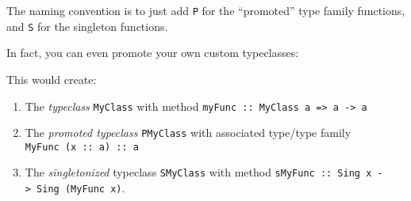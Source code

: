 \documentclass[]{article}
\newenvironment{Shaded}{}{}
\newcommand{\CommentTok}[1]{\textcolor[rgb]{0.38,0.63,0.69}{\textit{#1}}}
\newcommand{\DataTypeTok}[1]{\textcolor[rgb]{0.56,0.13,0.00}{#1}}
\newcommand{\FunctionTok}[1]{\textcolor[rgb]{0.02,0.16,0.49}{#1}}
\newcommand{\KeywordTok}[1]{\textcolor[rgb]{0.00,0.44,0.13}{\textbf{#1}}}
\newcommand{\NormalTok}[1]{#1}
\newcommand{\OtherTok}[1]{\textcolor[rgb]{0.00,0.44,0.13}{#1}}
\begin{document}
\begin{Shaded}
\end{Shaded}

The naming convention is to just add \texttt{P} for the ``promoted'' type family
functions, and \texttt{S} for the singleton functions.

In fact, you can even promote your own custom typeclasses:

\begin{Shaded}
\end{Shaded}

This would create:

\begin{enumerate}
\def\labelenumi{\arabic{enumi}.}
\tightlist
\item
  The \emph{typeclass} \texttt{MyClass} with method
  \texttt{myFunc\ ::\ MyClass\ a\ =\textgreater{}\ a\ -\textgreater{}\ a}
\item
  The \emph{promoted typeclass} \texttt{PMyClass} with associated type/type
  family \texttt{MyFunc\ (x\ ::\ a)\ ::\ a}
\item
  The \emph{singletonized} typeclass \texttt{SMyClass} with method
  \texttt{sMyFunc\ ::\ Sing\ x\ -\textgreater{}\ Sing\ (MyFunc\ x)}.
\end{enumerate}
\end{document}
